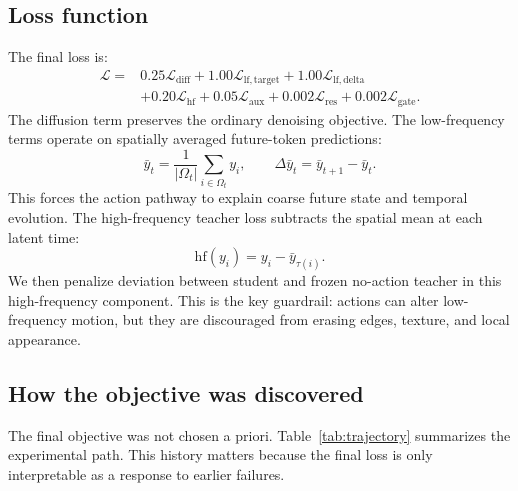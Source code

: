 \documentclass[10pt,twocolumn,letterpaper]{article}
\newcommand{\lossdiff}{\mathcal{L}_{\mathrm{diff}}}
\newcommand{\losshf}{\mathcal{L}_{\mathrm{hf}}}
\newcommand{\lossaux}{\mathcal{L}_{\mathrm{aux}}}
\begin{document}
\subsection{Loss function}

The final loss is:
\begin{equation}
\begin{split}
\mathcal{L} =
&0.25\lossdiff
+1.00\mathcal{L}_{\mathrm{lf,target}}
+1.00\mathcal{L}_{\mathrm{lf,delta}}\\
&+0.20\losshf
+0.05\lossaux
+0.002\mathcal{L}_{\mathrm{res}}
+0.002\mathcal{L}_{\mathrm{gate}}.
\end{split}
\label{eq:loss}
\end{equation}
The diffusion term preserves the ordinary denoising objective. The low-frequency terms operate on spatially averaged future-token predictions:
\begin{equation}
\bar{y}_{t}=\frac{1}{|\Omega_t|}\sum_{i\in\Omega_t} y_i,\qquad
\Delta\bar{y}_{t}=\bar{y}_{t+1}-\bar{y}_{t}.
\end{equation}
This forces the action pathway to explain coarse future state and temporal evolution. The high-frequency teacher loss subtracts the spatial mean at each latent time:
\begin{equation}
\mathrm{hf}(y_i)=y_i-\bar{y}_{\tau(i)}.
\end{equation}
We then penalize deviation between student and frozen no-action teacher in this high-frequency component. This is the key guardrail: actions can alter low-frequency motion, but they are discouraged from erasing edges, texture, and local appearance.

\subsection{How the objective was discovered}

The final objective was not chosen a priori. Table~\ref{tab:trajectory} summarizes the experimental path. This history matters because the final loss is only interpretable as a response to earlier failures.
\end{document}
